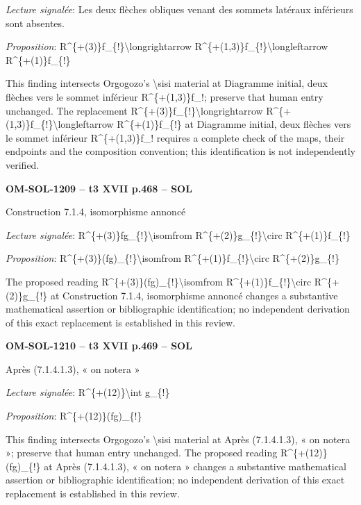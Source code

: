 \emph{Lecture signalée}: Les deux flèches obliques venant des sommets latéraux inférieurs sont absentes.\par
\emph{Proposition}: R\textasciicircum{}\{+(3)\}f\_\{!\}\textbackslash{}longrightarrow R\textasciicircum{}\{+(1,3)\}f\_\{!\}\textbackslash{}longleftarrow R\textasciicircum{}\{+(1)\}f\_\{!\}\par
This finding intersects Orgogozo's \textbackslash{}sisi material at Diagramme initial, deux flèches vers le sommet inférieur R\textasciicircum{}\{+(1,3)\}f\_!; preserve that human entry unchanged. The replacement R\textasciicircum{}\{+(3)\}f\_\{!\}\textbackslash{}longrightarrow R\textasciicircum{}\{+(1,3)\}f\_\{!\}\textbackslash{}longleftarrow R\textasciicircum{}\{+(1)\}f\_\{!\} at Diagramme initial, deux flèches vers le sommet inférieur R\textasciicircum{}\{+(1,3)\}f\_! requires a complete check of the maps, their endpoints and the composition convention; this identification is not independently verified.\par
\par\noindent\textbf{OM-SOL-1209 -- t3 XVII p.468 -- SOL}\par
Construction 7.1.4, isomorphisme annoncé\par
\emph{Lecture signalée}: R\textasciicircum{}\{+(3)\}fg\_\{!\}\textbackslash{}isomfrom R\textasciicircum{}\{+(2)\}g\_\{!\}\textbackslash{}circ R\textasciicircum{}\{+(1)\}f\_\{!\}\par
\emph{Proposition}: R\textasciicircum{}\{+(3)\}(fg)\_\{!\}\textbackslash{}isomfrom R\textasciicircum{}\{+(1)\}f\_\{!\}\textbackslash{}circ R\textasciicircum{}\{+(2)\}g\_\{!\}\par
The proposed reading R\textasciicircum{}\{+(3)\}(fg)\_\{!\}\textbackslash{}isomfrom R\textasciicircum{}\{+(1)\}f\_\{!\}\textbackslash{}circ R\textasciicircum{}\{+(2)\}g\_\{!\} at Construction 7.1.4, isomorphisme annoncé changes a substantive mathematical assertion or bibliographic identification; no independent derivation of this exact replacement is established in this review.\par
\par\noindent\textbf{OM-SOL-1210 -- t3 XVII p.469 -- SOL}\par
Après (7.1.4.1.3), « on notera »\par
\emph{Lecture signalée}: R\textasciicircum{}\{+(12)\}\textbackslash{}int g\_\{!\}\par
\emph{Proposition}: R\textasciicircum{}\{+(12)\}(fg)\_\{!\}\par
This finding intersects Orgogozo's \textbackslash{}sisi material at Après (7.1.4.1.3), « on notera »; preserve that human entry unchanged. The proposed reading R\textasciicircum{}\{+(12)\}(fg)\_\{!\} at Après (7.1.4.1.3), « on notera » changes a substantive mathematical assertion or bibliographic identification; no independent derivation of this exact replacement is established in this review.\par
